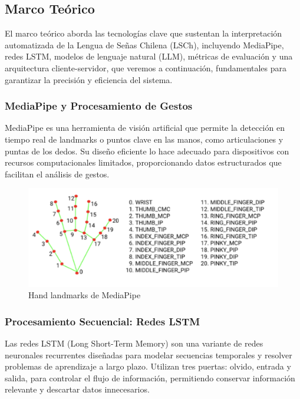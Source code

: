 \documentclass{article}
\begin{document}
\subsection{Marco Teórico}

El marco teórico aborda las tecnologías clave que sustentan la interpretación automatizada de la Lengua de Señas Chilena (LSCh), incluyendo MediaPipe, redes LSTM, modelos de lenguaje natural (LLM), métricas de evaluación y una arquitectura cliente-servidor, que veremos a continuación, fundamentales para garantizar la precisión y eficiencia del sistema.

\subsubsection{MediaPipe y Procesamiento de Gestos}

MediaPipe es una herramienta de visión artificial que permite la detección en tiempo real de landmarks o puntos clave en las manos, como articulaciones y puntas de los dedos. Su diseño eficiente lo hace adecuado para dispositivos con recursos computacionales limitados, proporcionando datos estructurados que facilitan el análisis de gestos. 

\begin{figure}[!hbtp]
    \centering
    \includegraphics[width=5in]{figuras/HandLandMarksMediaPipe.png}
		\caption{Hand landmarks de MediaPipe}
		\label{fig1}
\end{figure}

\subsubsection{Procesamiento Secuencial: Redes LSTM}

Las redes LSTM (Long Short-Term Memory) son una variante de redes neuronales recurrentes diseñadas para modelar secuencias temporales y resolver problemas de aprendizaje a largo plazo. Utilizan tres puertas: olvido, entrada y salida, para controlar el flujo de información, permitiendo conservar información relevante y descartar datos innecesarios.
\end{document}
